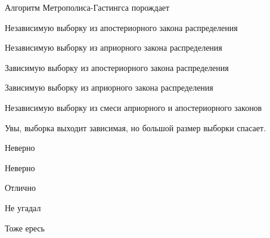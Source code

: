 
\begin{question}
Алгоритм Метрополиса-Гастингса порождает
\begin{answerlist}
  \item Независимую выборку из апостериорного закона распределения
  \item Независимую выборку из априорного закона распределения
  \item Зависимую выборку из апостериорного закона распределения
  \item Зависимую выборку из априорного закона распределения
  \item Независимую выборку из смеси априорного и апостериорного законов
\end{answerlist}
\end{question}

\begin{solution}
Увы, выборка выходит зависимая, но большой размер выборки спасает.
\begin{answerlist}
  \item Неверно
  \item Неверно
  \item Отлично
  \item Не угадал
  \item Тоже ересь
\end{answerlist}
\end{solution}

